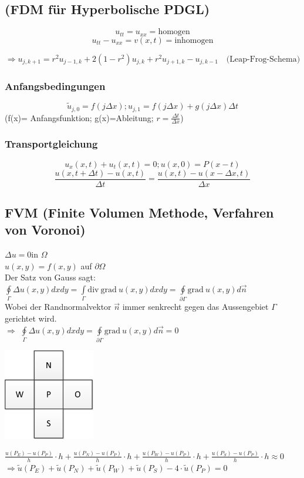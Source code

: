 \subsection{(FDM für Hyperbolische PDGL)}

$$u_{tt}=u_{xx} = \text{homogen}$$
$$u_{tt} -u_{xx}= v(x,t) = \text{inhomogen}$$

$$\Longrightarrow u_{j,k+1}=r^2 u_{j-1,k} + 2(1-r^2)u_{j,k}+ r^2
u_{j+1,k}-u_{j,k-1} \quad \text{(Leap-Frog-Schema)}$$
\subsubsection{Anfangsbedingungen}
$$\tilde{u}_{j,0} = f(j\Delta x); u_{j,1}= f(j\Delta x) + g(j\Delta x)\Delta t$$
(f(x)= Anfangsfunktion; g(x)=Ableitung; $r = \frac{\Delta t}{\Delta x}$)

\subsubsection{Transportgleichung}
$$u_x(x,t) + u_t(x, t) = 0; u(x,0)=P(x-t)$$
$$\frac{u(x,t+\Delta t)-u(x,t)}{\Delta t} = \frac{u(x,t) - u(x-\Delta x,
t)}{\Delta x}$$

\subsection{FVM (Finite Volumen Methode, Verfahren von Voronoi)}
$\Delta u=0$\qquad in \quad$\Omega$\\
$u(x,y)=f(x,y)$ \qquad auf \quad$\partial\Omega$\\
Der Satz von Gauss sagt: $\boxed{\oint\limits_{\Gamma}{\Delta u(x,y) dx dy}=\int\limits_{\Gamma}{\mathrm{div}~\mathrm{grad}~ u(x,y) dx dy}=\oint\limits_{\partial\Gamma}{\mathrm{grad}~ u(x,y) d\vec{n}}}$\\


Wobei der Randnormalvektor $\vec{n}$ immer senkrecht gegen das Aussengebiet $\Gamma$ gerichtet wird.\\

$\Rightarrow$ $\oint\limits_{\Gamma}{\Delta u(x,y) dx dy}=\oint\limits_{\partial\Gamma}{\mathrm{grad}~ u(x,y) d\vec{n}}=0$

\begin{minipage}{4cm}
	\includegraphics[width=4cm]{Content/Numerik/FVMPrinzip.png}
\end{minipage}
\hfill
\begin{minipage}{14cm}
	$\frac{u(P_E)-u(P_P)}{h}\cdot h+\frac{u(P_N)-u(P_P)}{h}\cdot h+\frac{u(P_W)-u(P_P)}{h}\cdot h+\frac{u(P_S)-u(P_P)}{h}\cdot h\approx 0$\\
	
	$\Rightarrow\tilde{u}(P_E)+\tilde{u}(P_N)+\tilde{u}(P_W)+\tilde{u}(P_S)-4\cdot\tilde{u}(P_P)=0$
\end{minipage}

